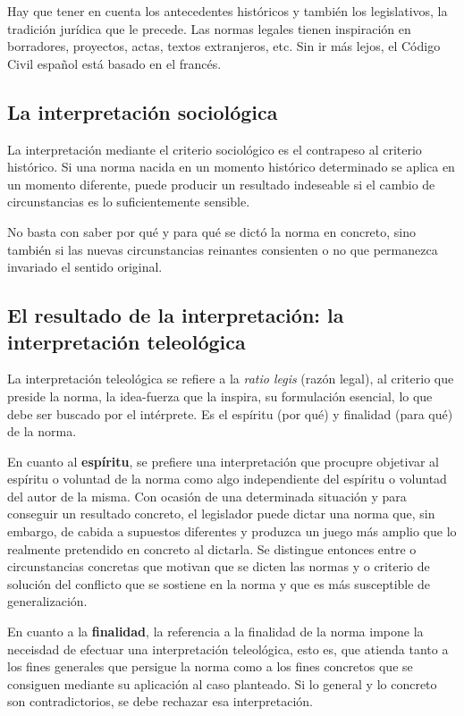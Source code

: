 \documentclass[a4paper,12pt]{report}
\begin{document}
Hay que tener en cuenta los antecedentes históricos y también los legislativos, la tradición jurídica que le precede. Las normas legales tienen inspiración en borradores, proyectos, actas, textos extranjeros, etc. Sin ir más lejos, el Código Civil español está basado en el francés.

\subsection{La interpretación sociológica}

La interpretación mediante el criterio sociológico es el contrapeso al criterio histórico. Si una norma nacida en un momento histórico determinado se aplica en un momento diferente, puede producir un resultado indeseable si el cambio de circunstancias es lo suficientemente sensible.

No basta con saber por qué y para qué se dictó la norma en concreto, sino también si las nuevas circunstancias reinantes consienten o no que permanezca invariado el sentido original.

\subsection{El resultado de la interpretación: la interpretación teleológica}

La interpretación teleológica se refiere a la \textit{ratio legis} (razón legal), al criterio que preside la norma, la idea-fuerza que la inspira, su formulación esencial, lo que debe ser buscado por el intérprete. Es el espíritu (por qué) y finalidad (para qué) de la norma.

En cuanto al \textbf{espíritu}, se prefiere una interpretación que procupre objetivar al espíritu o voluntad de la norma como algo independiente del espíritu o voluntad del autor de la misma. Con ocasión de una determinada situación y para conseguir un resultado concreto, el legislador puede dictar una norma que, sin embargo, de cabida a supuestos diferentes y produzca un juego más amplio que lo realmente pretendido en concreto al dictarla. Se distingue entonces entre  o circunstancias concretas que motivan que se dicten las normas y  o criterio de solución del conflicto que se sostiene en la norma y que es más susceptible de generalización.

En cuanto a la \textbf{finalidad}, la referencia a la finalidad de la norma impone la neceisdad de efectuar una interpretación teleológica, esto es, que atienda tanto a los fines generales que persigue la norma como a los fines concretos que se consiguen mediante su aplicación al caso planteado. Si lo general y lo concreto son contradictorios, se debe rechazar esa interpretación.
\end{document}
